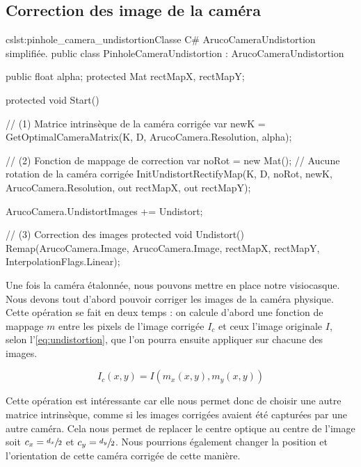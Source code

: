 \subsection{Correction des image de la caméra}
\label{subsec:pinhole_camera_undistortion}


\begin{listingETS}{cs}{lst:pinhole_camera_undistortion}{Classe C\# ArucoCameraUndistortion simplifiée.}
  public class PinholeCameraUndistortion : ArucoCameraUndistortion
  {
    public float alpha;
    protected Mat rectMapX, rectMapY;

    protected void Start()
    {
      // (1) Matrice intrinsèque de la caméra corrigée
      var newK = GetOptimalCameraMatrix(K, D, ArucoCamera.Resolution, alpha);

      // (2) Fonction de mappage de correction
      var noRot = new Mat(); // Aucune rotation de la caméra corrigée
      InitUndistortRectifyMap(K, D, noRot, newK, ArucoCamera.Resolution, out rectMapX, out rectMapY);

      ArucoCamera.UndistortImages += Undistort;
    }

    // (3) Correction des images
    protected void Undistort()
    {
      Remap(ArucoCamera.Image, ArucoCamera.Image, rectMapX, rectMapY, InterpolationFlags.Linear);
    }
  }
\end{listingETS}

Une fois la caméra étalonnée, nous pouvons mettre en place notre visiocasque. Nous devons tout d'abord pouvoir corriger les images de la caméra physique. Cette opération se fait en deux temps : on calcule d'abord une fonction de mappage $m$ entre les pixels de l'image corrigée $I_c$ et ceux l'image originale $I$, selon l'\autoref{eq:undistortion}, que l'on pourra ensuite appliquer sur chacune des images.

\begin{equation}
  \label{eq:undistortion}
  I_c(x,y) = I(m_x(x,y), m_y(x,y))
\end{equation}

Cette opération est intéressante car elle nous permet donc de choisir une autre matrice intrinsèque, comme si les images corrigées avaient été capturées par une autre caméra. Cela nous permet de replacer le centre optique au centre de l'image soit $c_x = \sfrac{d_x}{2}$ et $c_y = \sfrac{d_y}{2}$. Nous pourrions également changer la position et l'orientation de cette caméra corrigée de cette manière.


